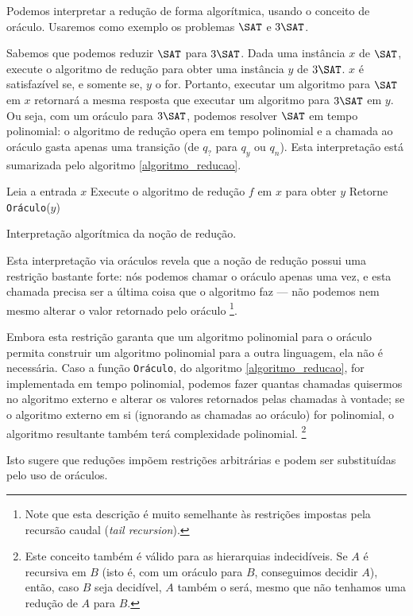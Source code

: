 Podemos interpretar a redução de forma algorítmica,
usando o conceito de oráculo.
Usaremos como exemplo os problemas $\SAT$ e $3\SAT$.

Sabemos que podemos reduzir $\SAT$ para $3\SAT$.
Dada uma instância $x$ de $\SAT$,
execute o algoritmo de redução para obter uma instância $y$ de $3\SAT$.
$x$ é satisfazível se, e somente se, $y$ o for.
Portanto, executar um algoritmo para $\SAT$ em $x$
retornará a mesma resposta
que executar um algoritmo para $3\SAT$ em $y$.
Ou seja, com um oráculo para $3\SAT$,
podemos resolver $\SAT$ em tempo polinomial:
o algoritmo de redução opera em tempo polinomial
e a chamada ao oráculo gasta apenas uma transição
(de $q_?$ para $q_y$ ou $q_n$).
Esta interpretação está sumarizada pelo algoritmo \ref{algoritmo_reducao}.

\begin{algorithm}[h]
    Leia a entrada $x$\;
    Execute o algoritmo de redução $f$ em $x$ para obter $y$\;
    Retorne \texttt{Oráculo}($y$)\;
    \caption{
        Interpretação algorítmica da noção de redução.
    }
    \label{algoritmo_reducao}
\end{algorithm}

Esta interpretação via oráculos revela que
a noção de redução possui uma restrição bastante forte:
nós podemos chamar o oráculo apenas uma vez,
e esta chamada precisa ser a última coisa que o algoritmo faz
--- não podemos nem mesmo alterar o valor retornado pelo oráculo%
\footnote{
    Note que esta descrição é muito semelhante
    às restrições impostas pela recursão caudal
    (\emph{tail recursion}).
}.

Embora esta restrição garanta que
um algoritmo polinomial para o oráculo
permita construir um algoritmo polinomial para a outra linguagem,
ela não é necessária.
Caso a função \texttt{Oráculo}, do algoritmo \ref{algoritmo_reducao},
for implementada em tempo polinomial,
podemos fazer quantas chamadas quisermos no algoritmo externo
e alterar os valores retornados pelas chamadas à vontade;
se o algoritmo externo em si
(ignorando as chamadas ao oráculo)
for polinomial,
o algoritmo resultante também terá complexidade polinomial.
\footnote{
    Este conceito também é válido para as hierarquias indecidíveis.
    Se $A$ é recursiva em $B$
    (isto é, com um oráculo para $B$, conseguimos decidir $A$),
    então, caso $B$ seja decidível,
    $A$ também o será,
    mesmo que não tenhamos uma redução de $A$ para $B$.
}

Isto sugere que reduções impõem restrições arbitrárias
e podem ser substituídas pelo uso de oráculos.
